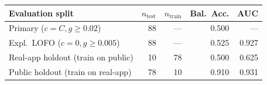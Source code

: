 \begin{tabular}{lrrrr}
\toprule
Evaluation split & $n_{\text{test}}$ & $n_{\text{train}}$ & Bal.\ Acc. & AUC \\
\midrule
Primary ($c=C, g \ge 0.02$) & 88 & --- & 0.500 & --- \\
Expl.\ LOFO ($c=0, g \ge 0.005$) & 88 & --- & 0.525 & 0.927 \\
Real-app holdout (train on public) & 10 & 78 & 0.500 & 0.625 \\
Public holdout (train on real-app) & 78 & 10 & 0.910 & 0.931 \\
\bottomrule
\end{tabular}

